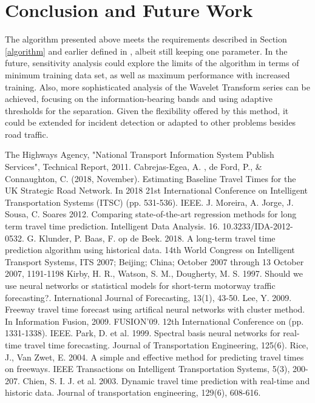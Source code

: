 \documentclass[a4paper, 10pt, conference]{ieeeconf}      %
\begin{document}
\section{Conclusion and Future Work}
The algorithm presented above meets the requirements described in Section \ref{algorithm} and earlier defined in \cite{ttprofiles}, albeit still keeping one parameter.
In the future, sensitivity analysis could explore the limits of the algorithm in terms of minimum training data set, as well as maximum performance with increased training.
Also, more sophisticated analysis of the Wavelet Transform series can be achieved, focusing on the information-bearing bands and using adaptive thresholds for the separation.
Given the flexibility offered by this method, it could be extended for incident detection or adapted to other problems besides road traffic.
\clearpage
\begin{thebibliography}{00}
 The Highways Agency, "National Transport Information System Publish Services", Technical Report, 2011. 
 Cabrejas-Egea, A. , de Ford, P., \& Connaughton, C. (2018, November). Estimating Baseline Travel Times for the UK Strategic Road Network. In 2018 21st International Conference on Intelligent Transportation Systems (ITSC) (pp. 531-536). IEEE.
 J. Moreira, A. Jorge, J. Sousa, C. Soares 2012. Comparing state-of-the-art regression methods for long term travel time prediction. Intelligent Data Analysis. 16. 10.3233/IDA-2012-0532. 
 G. Klunder, P. Baas, F. op de Beek. 2018. A long-term travel time prediction algorithm using historical data. 14th World Congress on Intelligent Transport Systems, ITS 2007; Beijing; China; October 2007 through 13 October 2007, 1191-1198
 Kirby, H. R., Watson, S. M., Dougherty, M. S. 1997. Should we use neural networks or statistical models for short-term motorway traffic forecasting?. International Journal of Forecasting, 13(1), 43-50.
 Lee, Y. 2009. Freeway travel time forecast using artifical neural networks with cluster method. In Information Fusion, 2009. FUSION'09. 12th International Conference on (pp. 1331-1338). IEEE.
 Park, D. et al. 1999. Spectral basis neural networks for real-time travel time forecasting. Journal of Transportation Engineering, 125(6).
 Rice, J., Van Zwet, E. 2004. A simple and effective method for predicting travel times on freeways. IEEE Transactions on Intelligent Transportation Systems, 5(3), 200-207.
 Chien, S. I. J. et al. 2003. Dynamic travel time prediction with real-time and historic data. Journal of transportation engineering, 129(6), 608-616.

\end{thebibliography}
\end{document}
